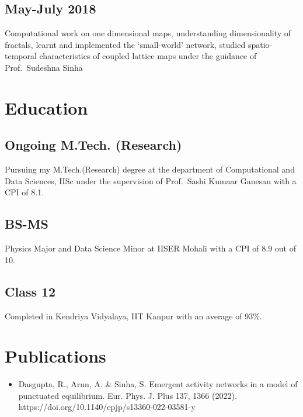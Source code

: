 \documentclass{article}
\begin{document}

\subsection{May-July 2018}

Computational work on one dimensional maps,
understanding dimensionality of fractals,
learnt and implemented the `small-world' network,
studied spatio-temporal characteristics
of coupled lattice maps
under the guidance of Prof.~Sudeshna Sinha

\section{Education}

\subsection{Ongoing M.Tech. (Research)}
Pursuing my M.Tech.(Research) degree at the
department of Computational and Data Sciences, IISc
under the supervision of Prof.~Sashi Kumaar Ganesan
with a CPI of 8.1.

\subsection{BS-MS}
Physics Major and Data Science Minor
at IISER Mohali with a CPI of 8.9 out of 10.

\subsection{Class 12} 
Completed in Kendriya Vidyalaya, IIT Kanpur
with an average of 93\%.

\section{Publications}

\begin{itemize}
  \item
Dasgupta, R., Arun, A. \& Sinha, S. Emergent activity networks in a model of punctuated equilibrium. Eur. Phys. J. Plus 137, 1366 (2022). https://doi.org/10.1140/epjp/s13360-022-03581-y
\end{itemize}
\end{document}
